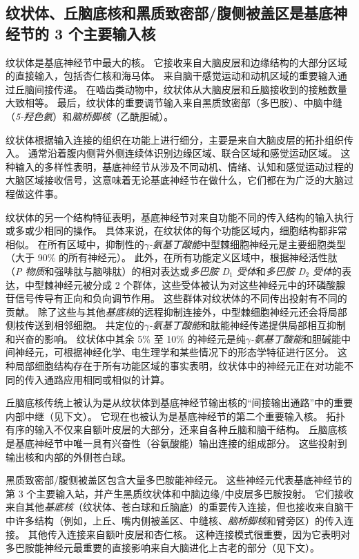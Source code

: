 \subsection{纹状体、丘脑底核和黑质致密部/腹侧被盖区是基底神经节的 3 个主要输入核}

纹状体是基底神经节中最大的核。
它接收来自大脑皮层和边缘结构的大部分区域的直接输入，包括杏仁核和海马体。
来自脑干感觉运动和动机区域的重要输入通过丘脑间接传递。
在啮齿类动物中，纹状体从大脑皮层和丘脑接收到的接触数量大致相等。
最后，纹状体的重要调节输入来自黑质致密部（多巴胺）、中脑中缝（\textit{5-羟色氨}）和\textit{脑桥脚核}（乙酰胆碱）。


纹状体根据输入连接的组织在功能上进行细分，主要是来自大脑皮层的拓扑组织传入。
通常沿着腹内侧背外侧连续体识别边缘区域、联合区域和感觉运动区域。
这种输入的多样性表明，基底神经节从涉及不同动机、情绪、认知和感觉运动过程的大脑区域接收信号，这意味着无论基底神经节在做什么，它们都在为广泛的大脑过程做这件事。


纹状体的另一个结构特征表明，基底神经节对来自功能不同的传入结构的输入执行或多或少相同的操作。
具体来说，在纹状体的每个功能区域内，细胞结构都非常相似。
在所有区域中，抑制性的\textit{$\gamma$-氨基丁酸能}中型棘细胞神经元是主要细胞类型（大于 90\% 的所有神经元）。
此外，在所有功能定义区域中，根据神经活性肽（\textit{P 物质}和强啡肽与脑啡肽）的相对表达或\textit{多巴胺 D$_1$ 受体}和\textit{多巴胺 D$_2$ 受体}的表达，中型棘神经元被分成 2 个群体，这些受体被认为对这些神经元中的环磷酸腺苷信号传导有正向和负向调节作用。
这些群体对纹状体的不同传出投射有不同的贡献。
除了这些与其他\textit{基底核}的远程抑制连接外，中型棘细胞神经元还会将局部侧枝传送到相邻细胞。
共定位的\textit{$\gamma$-氨基丁酸能}和肽能神经传递提供局部相互抑制和兴奋的影响。
纹状体中其余 5\% 至 10\% 的神经元是纯\textit{$\gamma$-氨基丁酸能}和胆碱能中间神经元，可根据神经化学、电生理学和某些情况下的形态学特征进行区分。
这种局部细胞结构存在于所有功能区域的事实表明，纹状体中的神经元正在对功能不同的传入通路应用相同或相似的计算。


丘脑底核传统上被认为是从纹状体到基底神经节输出核的“间接输出通路”中的重要内部中继（见下文）。
它现在也被认为是基底神经节的第二个重要输入核。
拓扑有序的输入不仅来自额叶皮层的大部分，还来自各种丘脑和脑干结构。
丘脑底核是基底神经节中唯一具有兴奋性（谷氨酸能）输出连接的组成部分。
这些投射到输出核和内部的外侧苍白球。


黑质致密部/腹侧被盖区包含大量多巴胺能神经元。
这些神经元代表基底神经节的第 3 个主要输入站，并产生黑质纹状体和中脑边缘/中皮层多巴胺投射。
它们接收来自其他\textit{基底核}（纹状体、苍白球和丘脑底）的重要传入连接，但也接收来自脑干中许多结构（例如，上丘、嘴内侧被盖区、中缝核、\textit{脑桥脚核}和臂旁区）的传入连接。
其他传入连接来自额叶皮层和杏仁核。
这种连接模式很重要，因为它表明对多巴胺能神经元最重要的直接影响来自大脑进化上古老的部分（见下文）。


